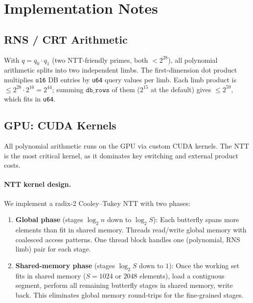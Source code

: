 \documentclass[11pt,a4paper]{article}
\begin{document}
\section{Implementation Notes}\label{sec:impl}

\subsection{RNS / CRT Arithmetic}

With $q = q_0 \cdot q_1$ (two NTT-friendly primes, both $< 2^{28}$), all polynomial arithmetic splits into two independent limbs.
The first-dimension dot product multiplies \texttt{u16} DB entries by \texttt{u64} query values per limb.
Each limb product is $\le 2^{28} \cdot 2^{16} = 2^{44}$; summing $\texttt{db\_rows}$ of them ($2^{15}$ at the default) gives $\le 2^{59}$, which fits in \texttt{u64}.

\subsection{GPU: CUDA Kernels}\label{sec:cuda}

All polynomial arithmetic runs on the GPU via custom CUDA kernels.
The NTT is the most critical kernel, as it dominates key switching and external product costs.

\paragraph{NTT kernel design.}
We implement a radix-2 Cooley--Tukey NTT with two phases:
\begin{enumerate}[nosep]
    \item \textbf{Global phase} (stages $\log_2 n$ down to $\log_2 S$):
    Each butterfly spans more elements than fit in shared memory.
    Threads read/write global memory with coalesced access patterns.
    One thread block handles one (polynomial, RNS limb) pair for each stage.

    \item \textbf{Shared-memory phase} (stages $\log_2 S$ down to $1$):
    Once the working set fits in shared memory ($S = 1024$ or $2048$ elements), load a contiguous segment, perform all remaining butterfly stages in shared memory, write back.
    This eliminates global memory round-trips for the fine-grained stages.
\end{enumerate}
\end{document}

